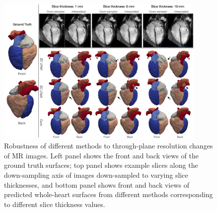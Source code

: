 \documentclass[times,review,preprint,authoryear]{elsarticle}
\begin{document}
\begin{figure}[H]
\centering
\includegraphics[width=0.9\textwidth]{resolution_longi.png}
\caption{Robustness of different methods to through-plane resolution changes of MR images. Left panel shows the front and back views of the ground truth surfaces; top panel shows example slices along the down-sampling axis of images down-sampled to varying slice thicknesses, and bottom panel shows front and back views of predicted whole-heart surfaces from different methods corresponding to different slice thickness values.} 
\label{figure:resolution}
\end{figure}
\end{document}
